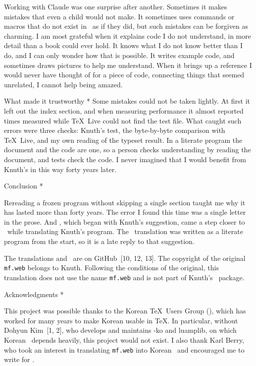 {Working with Claude was one surprise after another. Sometimes it makes
mistakes that even a child would not make. It sometimes uses commands
or macros that do not exist in \GWEB\ as if they did, but such
mistakes can be forgiven as charming. I am most grateful when it
explains code I do not understand, in more detail than a book could
ever hold. It knows what I do not know better than I do, and I can only
wonder how that is possible. It writes example code, and sometimes
draws pictures to help me understand. When it brings up a reference I
would never have thought of for a piece of code, connecting things
that seemed unrelated, I cannot help being amazed.

\subhead * What made it trustworthy *
Some mistakes could not be taken lightly. At first it left out the
index section, and when measuring performance it almost reported times
measured while \TeX\ Live could not find the test file. What caught
such errors were three checks: Knuth's  test, the
byte-by-byte comparison with \TeX\ Live, and my own reading of the
typeset result. In a literate program the document and the code are
one, so a person checks understanding by reading the document, and
tests check the code. I never imagined that I would benefit from
Knuth's  in this way forty years later.

\quad Conclusion *

Rereading a frozen program without skipping a single section taught me
why it has lasted more than forty years. The error I found this time
was a single letter in the prose. And \GWEB, which began with Knuth's
suggestion, came a step closer to \CWEB\ while translating Knuth's
program. The \MF\ translation was written as a literate program from
the start, so it is a late reply to that suggestion.

The translations and \GWEB\ are on GitHub~[10, 12, 13]. The copyright of
the original {\tt mf.web} belongs to Knuth. Following the conditions of
the original, this translation does not use the name {\tt mf.web} and
is not part of Knuth's \MF\ package.

\head * Acknowledgments *

This project was possible thanks to the Korean \TeX\ Users Group
(), which has worked for many years to make Korean usable in
\TeX. In particular, without Dohyun Kim~[1, 2], who develops and
maintains \LuaTeX-ko and luamplib, on which Korean \GWEB\ depends
heavily, this project would not exist. I also thank Karl Berry, who
took an interest in translating {\tt mf.web} into Korean \GWEB\ and
encouraged me to write for \TUB.

}
